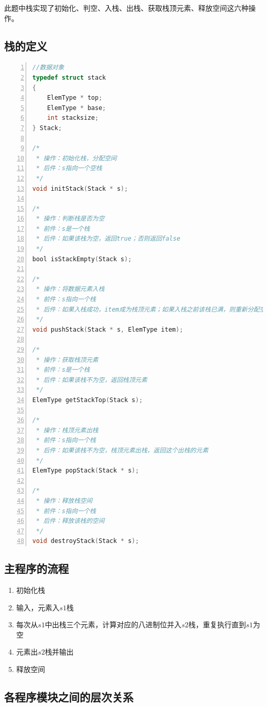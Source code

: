 \documentclass{article}
\begin{document}
此题中栈实现了初始化、判空、入栈、出栈、获取栈顶元素、释放空间这六种操作。

\subsection{栈的定义}

\begin{lstlisting}[language={C},
    numbers=left,
    numberstyle=\tiny\consolas,
    basicstyle=\small\consolas]
//数据对象
typedef struct stack
{
    ElemType * top;
    ElemType * base;
    int stacksize;
} Stack;

/*
 * 操作：初始化栈，分配空间
 * 后件：s指向一个空栈
 */
void initStack(Stack * s);

/*
 * 操作：判断栈是否为空
 * 前件：s是一个栈
 * 后件：如果该栈为空，返回true；否则返回false
 */
bool isStackEmpty(Stack s);

/*
 * 操作：将数据元素入栈
 * 前件：s指向一个栈
 * 后件：如果入栈成功，item成为栈顶元素；如果入栈之前该栈已满，则重新分配空间
 */
void pushStack(Stack * s, ElemType item);

/*
 * 操作：获取栈顶元素
 * 前件：s是一个栈
 * 后件：如果该栈不为空，返回栈顶元素
 */
ElemType getStackTop(Stack s);

/*
 * 操作：栈顶元素出栈
 * 前件：s指向一个栈
 * 后件：如果该栈不为空，栈顶元素出栈，返回这个出栈的元素
 */
ElemType popStack(Stack * s);

/*
 * 操作：释放栈空间
 * 前件：s指向一个栈
 * 后件：释放该栈的空间
 */
void destroyStack(Stack * s);
\end{lstlisting}

\subsection{主程序的流程}

\begin{enumerate}
    \item 初始化栈
    \item 输入，元素入$s1$栈
    \item 每次从$s1$中出栈三个元素，计算对应的八进制位并入$s2$栈，重复执行直到$s1$为空
    \item 元素出$s2$栈并输出
    \item 释放空间
\end{enumerate}

\subsection{各程序模块之间的层次关系}
\end{document}
